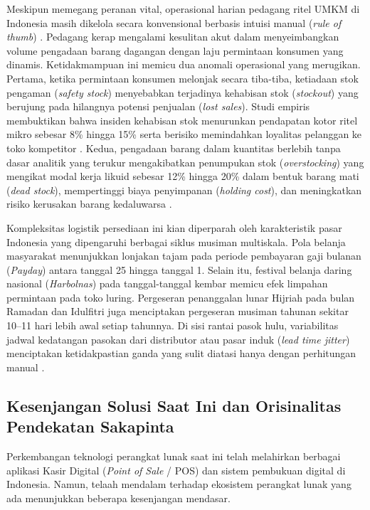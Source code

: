 \documentclass[12pt,a4paper]{article}
\begin{document}
Meskipun memegang peranan vital, operasional harian pedagang ritel UMKM di Indonesia masih dikelola secara konvensional berbasis intuisi manual (\textit{rule of thumb}) \citep{fildes2022retail}. Pedagang kerap mengalami kesulitan akut dalam menyeimbangkan volume pengadaan barang dagangan dengan laju permintaan konsumen yang dinamis. Ketidakmampuan ini memicu dua anomali operasional yang merugikan. Pertama, ketika permintaan konsumen melonjak secara tiba-tiba, ketiadaan stok pengaman (\textit{safety stock}) menyebabkan terjadinya kehabisan stok (\textit{stockout}) yang berujung pada hilangnya potensi penjualan (\textit{lost sales}). Studi empiris membuktikan bahwa insiden kehabisan stok menurunkan pendapatan kotor ritel mikro sebesar 8\% hingga 15\% serta berisiko memindahkan loyalitas pelanggan ke toko kompetitor \citep{chopra2019supply}. Kedua, pengadaan barang dalam kuantitas berlebih tanpa dasar analitik yang terukur mengakibatkan penumpukan stok (\textit{overstocking}) yang mengikat modal kerja likuid sebesar 12\% hingga 20\% dalam bentuk barang mati (\textit{dead stock}), mempertinggi biaya penyimpanan (\textit{holding cost}), dan meningkatkan risiko kerusakan barang kedaluwarsa \citep{silver2016inventory}.

Kompleksitas logistik persediaan ini kian diperparah oleh karakteristik pasar Indonesia yang dipengaruhi berbagai siklus musiman multiskala. Pola belanja masyarakat menunjukkan lonjakan tajam pada periode pembayaran gaji bulanan (\textit{Payday}) antara tanggal 25 hingga tanggal 1. Selain itu, festival belanja daring nasional (\textit{Harbolnas}) pada tanggal-tanggal kembar memicu efek limpahan permintaan pada toko luring. Pergeseran penanggalan lunar Hijriah pada bulan Ramadan dan Idulfitri juga menciptakan pergeseran musiman tahunan sekitar 10--11 hari lebih awal setiap tahunnya. Di sisi rantai pasok hulu, variabilitas jadwal kedatangan pasokan dari distributor atau pasar induk (\textit{lead time jitter}) menciptakan ketidakpastian ganda yang sulit diatasi hanya dengan perhitungan manual \citep{makridakis2022m5}.

\subsection{Kesenjangan Solusi Saat Ini dan Orisinalitas Pendekatan Sakapinta}
Perkembangan teknologi perangkat lunak saat ini telah melahirkan berbagai aplikasi Kasir Digital (\textit{Point of Sale} / POS) dan sistem pembukuan digital di Indonesia. Namun, telaah mendalam terhadap ekosistem perangkat lunak yang ada menunjukkan beberapa kesenjangan mendasar.
\end{document}
